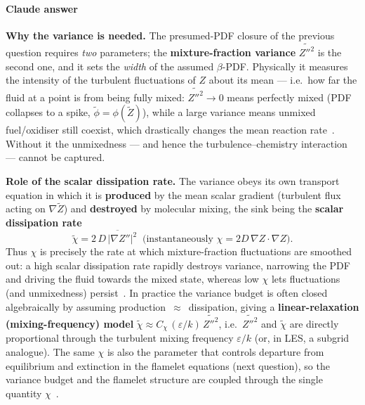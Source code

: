 {\color{istblue}
\paragraph{Claude answer}
\textbf{Why the variance is needed.} The presumed-PDF closure of the previous question requires \emph{two} parameters; the \textbf{mixture-fraction variance} $\widetilde{Z''^2}$ is the second one, and it sets the \emph{width} of the assumed $\beta$-PDF. Physically it measures the intensity of the turbulent fluctuations of $Z$ about its mean --- i.e.\ how far the fluid at a point is from being fully mixed: $\widetilde{Z''^2}\to0$ means perfectly mixed (PDF collapses to a spike, $\tilde\phi = \phi(\tilde Z)$), while a large variance means unmixed fuel/oxidiser still coexist, which drastically changes the mean reaction rate~\cite{lecture10,veynante2002turbulent,peters2000turbulent}. Without it the unmixedness --- and hence the turbulence--chemistry interaction --- cannot be captured.

\textbf{Role of the scalar dissipation rate.} The variance obeys its own transport equation in which it is \textbf{produced} by the mean scalar gradient (turbulent flux acting on $\nabla\tilde Z$) and \textbf{destroyed} by molecular mixing, the sink being the \textbf{scalar dissipation rate}
\begin{equation*}
\tilde\chi = 2\,\overline{D\,|\nabla Z''|^2} \;\; \big(\text{instantaneously } \chi = 2D\,\nabla Z\cdot\nabla Z\big).
\end{equation*}
Thus $\chi$ is precisely the rate at which mixture-fraction fluctuations are smoothed out: a high scalar dissipation rate rapidly destroys variance, narrowing the PDF and driving the fluid towards the mixed state, whereas low $\chi$ lets fluctuations (and unmixedness) persist~\cite{lecture10,warnatz2006combustion,peters2000turbulent}. In practice the variance budget is often closed algebraically by assuming production~$\approx$~dissipation, giving a \textbf{linear-relaxation (mixing-frequency) model} $\tilde\chi \approx C_\chi\,(\varepsilon/k)\,\widetilde{Z''^2}$, i.e.\ $\widetilde{Z''^2}$ and $\tilde\chi$ are directly proportional through the turbulent mixing frequency $\varepsilon/k$ (or, in LES, a subgrid analogue). The same $\chi$ is also the parameter that controls departure from equilibrium and extinction in the flamelet equations (next question), so the variance budget and the flamelet structure are coupled through the single quantity $\chi$~\cite{lecture10,peters2000turbulent}.
}




